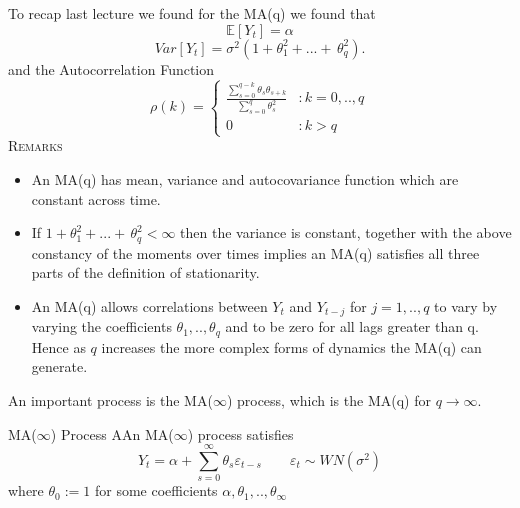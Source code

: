 \documentclass[openany]{tufte-book} %
\begin{document}
 To recap last lecture we found for the MA(q) we found that
\begin{equation*}
\mathbb{E}\left[ Y_{t}\right] =\alpha  \label{mean_MAq}
\end{equation*}
\[ Var\left[ Y_{t}\right] =\sigma^{2}\left( 1+\theta_{1}^{2}+...+\,\theta_{q}^{2}\right) .
\]
 and the Autocorrelation Function
 \begin{equation} \label{acfmaq}\rho(k) = \left\{
  \begin{array}{lr}
   \frac{\sum_{s=0}^{q-k}\theta_{s}\theta_{s+k}}{\sum_{s=0}^q\theta_s^2}   & : k =0,..,q\\
    0 & : k>q
  \end{array}
\right.
\end{equation}
\textsc{Remarks}
\begin{itemize}
\item An MA(q) has mean, variance and autocovariance function which are constant across time.
\item If $1+\theta_{1}^{2}+...+\,\theta_{q}^{2}<\infty$ then the variance is constant, together with the above constancy of the moments over times implies an MA(q) satisfies all three parts of the definition of stationarity.
\item An MA(q) allows correlations between $Y_t$ and $Y_{t-j}$ for $j=1,..,q$ to vary by varying the coefficients $\theta_1,..,\theta_q$ and to be zero for all lags greater than q. Hence as $q$ increases the more complex forms of dynamics the MA(q) can generate.

\end{itemize}













An important process is the MA($\infty$) process,  which is the MA(q) for $q \rightarrow \infty$.

\begin{mydef}{MA($\infty$) Process} AAn MA($\infty$) process satisfies
\begin{equation}
Y_{t} =\alpha +\sum_{s=0}^{\infty }\theta _{s}\varepsilon _{t-s} \qquad \varepsilon_t\sim WN(\sigma^2) \label{MA_infinite}
\end{equation}
where $\theta _{0}:=1$ for some coefficients $\alpha, \theta_1,..,\theta_{\infty} $\end{mydef}
\end{document}
